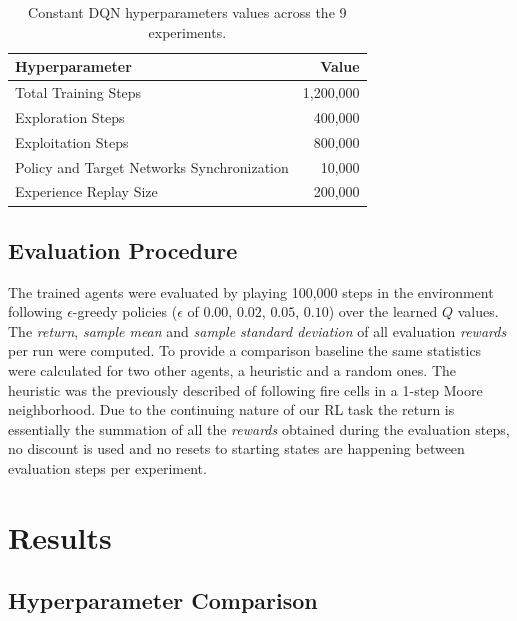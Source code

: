 \documentclass[
  openany]{book}
\begin{document}
\begin{table}

\caption{\label{tab:const}Constant DQN hyperparameters values across the 9 experiments.}
\centering
\begin{tabular}[t]{lr}
\toprule
Hyperparameter & Value\\
\midrule
\rowcolor{gray!6}  Total Training Steps & 1,200,000\\
Exploration Steps & 400,000\\
\rowcolor{gray!6}  Exploitation Steps & 800,000\\
Policy and Target Networks Synchronization & 10,000\\
\rowcolor{gray!6}  Experience Replay Size & 200,000\\
\bottomrule
\end{tabular}
\end{table}

\hypertarget{evaluation-procedure}{%
\subsection{Evaluation Procedure}\label{evaluation-procedure}}

The trained agents were evaluated by playing 100,000 steps in the environment following \(\epsilon\)-greedy policies (\(\epsilon\) of \(0.00\), \(0.02\), \(0.05\), \(0.10\)) over the learned \(Q\) values. The \emph{return}, \emph{sample mean} and \emph{sample standard deviation} of all evaluation \emph{rewards} per run were computed. To provide a comparison baseline the same statistics were calculated for two other agents, a heuristic and a random ones. The heuristic was the previously described of following fire cells in a 1-step Moore neighborhood. Due to the continuing nature of our RL task the return is essentially the summation of all the \emph{rewards} obtained during the evaluation steps, no discount is used and no resets to starting states are happening between evaluation steps per experiment.

\hypertarget{results}{%
\section{Results}\label{results}}

\hypertarget{hyperparameter-comparison}{%
\subsection{Hyperparameter Comparison}\label{hyperparameter-comparison}}
\end{document}
